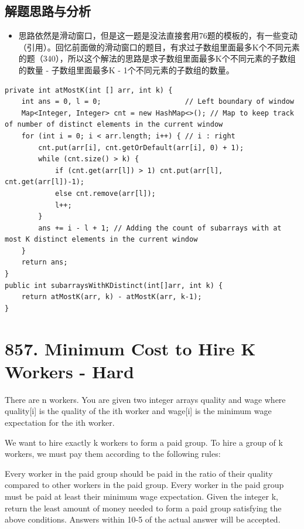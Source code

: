 \documentclass[9pt, b5paaper]{book}
\begin{document}
\subsection{解题思路与分析}
\label{sec-12-8-1}
\begin{itemize}
\item 思路依然是滑动窗口，但是这一题是没法直接套用76题的模板的，有一些变动（引用）。回忆前面做的滑动窗口的题目，有求过子数组里面最多K个不同元素的题（340），所以这个解法的思路是求子数组里面最多K个不同元素的子数组的数量 - 子数组里面最多K - 1个不同元素的子数组的数量。
\end{itemize}
\begin{verbatim}
private int atMostK(int [] arr, int k) {
    int ans = 0, l = 0;                    // Left boundary of window
    Map<Integer, Integer> cnt = new HashMap<>(); // Map to keep track of number of distinct elements in the current window
    for (int i = 0; i < arr.length; i++) { // i : right
        cnt.put(arr[i], cnt.getOrDefault(arr[i], 0) + 1);
        while (cnt.size() > k) {
            if (cnt.get(arr[l]) > 1) cnt.put(arr[l], cnt.get(arr[l])-1);
            else cnt.remove(arr[l]);
            l++;
        }
        ans += i - l + 1; // Adding the count of subarrays with at most K distinct elements in the current window
    }
    return ans;
}
public int subarraysWithKDistinct(int[]arr, int k) {
    return atMostK(arr, k) - atMostK(arr, k-1);
}
\end{verbatim}

\section{857. Minimum Cost to Hire K Workers - Hard}
\label{sec-12-9}
There are n workers. You are given two integer arrays quality and wage where quality[i] is the quality of the ith worker and wage[i] is the minimum wage expectation for the ith worker.

We want to hire exactly k workers to form a paid group. To hire a group of k workers, we must pay them according to the following rules:

Every worker in the paid group should be paid in the ratio of their quality compared to other workers in the paid group.
Every worker in the paid group must be paid at least their minimum wage expectation.
Given the integer k, return the least amount of money needed to form a paid group satisfying the above conditions. Answers within 10-5 of the actual answer will be accepted.
\end{document}
